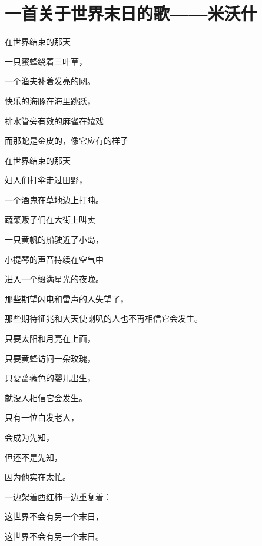 \section{一首关于世界末日的歌——米沃什}

在世界结束的那天

一只蜜蜂绕着三叶草，

一个渔夫补着发亮的网。

快乐的海豚在海里跳跃，

排水管旁有效的麻雀在嬉戏

而那蛇是金皮的，像它应有的样子

在世界结束的那天

妇人们打伞走过田野，

一个酒鬼在草地边上打盹。

蔬菜贩子们在大街上叫卖

一只黄帆的船驶近了小岛，

小提琴的声音持续在空气中

进入一个缀满星光的夜晚。

那些期望闪电和雷声的人失望了，

那些期待征兆和大天使喇叭的人也不再相信它会发生。

只要太阳和月亮在上面，

只要黄蜂访问一朵玫瑰，

只要蔷薇色的婴儿出生，

就没人相信它会发生。

只有一位白发老人，

会成为先知，

但还不是先知，

因为他实在太忙。

一边架着西红柿一边重复着：

这世界不会有另一个末日，

这世界不会有另一个末日。
